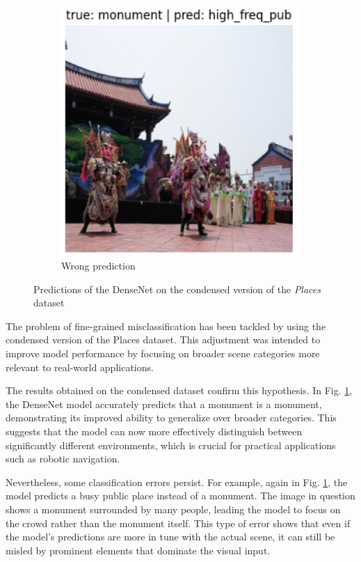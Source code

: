 \documentclass[twocolumn,superscriptaddress,aps]{revtex4-1}
\begin{document}
\begin{figure}[H]
\begin{subfigure}{0.235 \textwidth}
        \includegraphics[width=\textwidth]{images/17_error_monument.png}
        \caption{Wrong prediction}
    \end{subfigure}
    \caption{Predictions of the DenseNet on the condensed version of the \textit{Places} dataset}
    \label{fig:17_quali}
\end{figure}

The problem of fine-grained misclassification has been tackled by using the condensed version of the Places dataset. This adjustment was intended to improve model performance by focusing on broader scene categories more relevant to real-world applications.

The results obtained on the condensed dataset confirm this hypothesis. In Fig. \ref{fig:17_quali}, the DenseNet model accurately predicts that a monument is a monument, demonstrating its improved ability to generalize over broader categories. This suggests that the model can now more effectively distinguish between significantly different environments, which is crucial for practical applications such as robotic navigation.

Nevertheless, some classification errors persist. For example, again in Fig. \ref{fig:17_quali}, the model predicts a busy public place instead of a monument. The image in question shows a monument surrounded by many people, leading the model to focus on the crowd rather than the monument itself. This type of error shows that even if the model's predictions are more in tune with the actual scene, it can still be misled by prominent elements that dominate the visual input.
\end{document}
